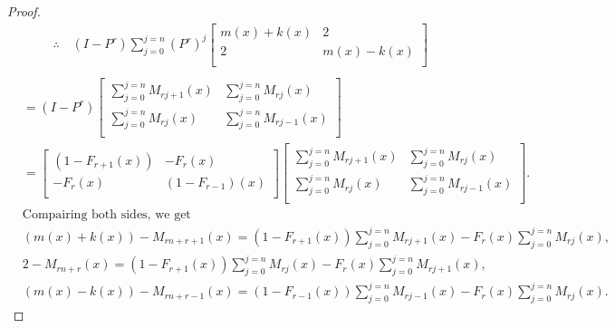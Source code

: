 \begin{proof}
\begin{align*}
&\therefore\quad
(I-P^r)\sum_{j=0}^{j=n}(P^r)^j{
 \begin{bmatrix}
    m(x)+k(x) & 2 \\
    2 & m(x)-k(x) \\
  \end{bmatrix}
}\\
\end{align*}	
 \begin{align*}	&= (I-P^r){
 \begin{bmatrix}
    \sum_{j=0}^{j=n}M_{rj+1}(x) & \sum_{j=0}^{j=n}M_{rj}(x) \\
    \sum_{j=0}^{j=n}M_{rj}(x)& \sum_{j=0}^{j=n}M_{rj-1}(x) \\
  \end{bmatrix}
}\\
&={
 \begin{bmatrix}
    (1-F_{r+1}(x)) & -F_{r}(x) \\
    -F_{r}(x) & (1-F_{r-1})(x) \\
  \end{bmatrix}
}{
 \begin{bmatrix}
    \sum_{j=0}^{j=n}M_{rj+1}(x) & \sum_{j=0}^{j=n}M_{rj}(x) \\
    \sum_{j=0}^{j=n}M_{rj}(x) & \sum_{j=0}^{j=n}M_{rj-1}(x) \\
  \end{bmatrix}
}.\\
&\text{Compairing both sides, we get}\\
&(m(x)+k(x))-M_{rn+r+1}(x)=(1-F_{r+1}(x))\sum_{j=0}^{j=n}M_{rj+1}(x)-F_{r}(x)\sum_{j=0}^{j=n}M_{rj}(x),\\
&2-M_{rn+r}(x)=(1-F_{r+1}(x))\sum_{j=0}^{j=n}M_{rj}(x)-F_{r}(x)\sum_{j=0}^{j=n}M_{rj+1}(x),\\
&(m(x)-k(x))-M_{rn+r-1}(x)=(1-F_{r-1}(x))\sum_{j=0}^{j=n}M_{rj-1}(x)-F_{r}(x)\sum_{j=0}^{j=n}M_{rj}(x).
\end{align*}
\end{proof}

